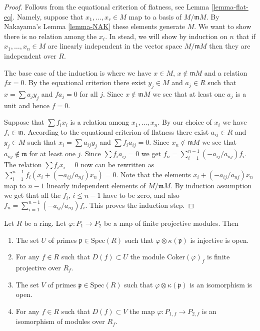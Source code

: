 \begin{proof}
Follows from the equational criterion of flatness, see
Lemma \ref{lemma-flat-eq}. Namely, suppose that 
$x_1,\ldots, x_r \in M$ map to a basis of
$M/\mathfrak mM$. By Nakayama's Lemma \ref{lemma-NAK}
these elements generate $M$. We want to show there
is no relation among the $x_i$. In stead, we will show
by induction on $n$ that if $x_1,\ldots,x_n \in M$
are linearly independent in the vector space
$M/\mathfrak mM$ then they are independent over $R$.

\medskip\noindent
The base case of the induction is where we have
$x \in M$, $x \not\in \mathfrak mM$ and a relation
$fx = 0$. By the equational criterion there
exist $y_j \in M$ and $a_j \in R$ such that
$x = \sum a_j y_j$ and $fa_j = 0$ for all $j$.
Since $x \not\in \mathfrak mM$ we see that
at least one $a_j$ is a unit and hence $f = 0 $.

\medskip\noindent
Suppose that $\sum f_i x_i$ is a relation among $x_1,\ldots,x_n$.
By our choice of $x_i$ we have $f_i \in \mathfrak m$.
According to the equational criterion of flatness there exist
$a_{ij} \in R$ and $y_j \in M$ such that
$x_i = \sum a_{ij} y_j$ and $\sum f_i a_{ij} = 0$.
Since $x_n \not \in \mathfrak mM$ we see that
$a_{nj}\not\in \mathfrak m$ for at least one $j$.
Since $\sum f_i a_{ij} = 0$ we get
$f_n = \sum_{i=1}^{n-1} (-a_{ij}/a_{nj}) f_i$.
The relation $\sum f_i x_i = 0$ now can be rewritten
as $\sum_{i=1}^{n-1} f_i( x_i + (-a_{ij}/a_{nj}) x_n) = 0$.
Note that the elements $x_i + (-a_{ij}/a_{nj}) x_n$ map
to $n-1$ linearly independent elements of $M/\mathfrak mM$.
By induction assumption we get that all the $f_i$, $i \leq n-1$
have to be zero, and also $f_n = \sum_{i=1}^{n-1} (-a_{ij}/a_{nj}) f_i$.
This proves the induction step.
\end{proof}

\begin{lemma}
\label{lemma-cokernel-flat}
Let $R$ be a ring. Let $\varphi : P_1 \to P_2$ be a map of
finite projective modules. Then
\begin{enumerate}
\item The set $U$ of primes
$\mathfrak p \in \text{Spec}(R)$ such that
$\varphi \otimes \kappa(\mathfrak p)$ is injective is open.
\item For any $f\in R$ such that
$D(f) \subset U$ the module $\text{Coker}(\varphi)_f$
is finite projective over $R_f$.
\item The set $V$ of primes $\mathfrak p \in \text{Spec}(R)$ such that
$\varphi \otimes \kappa(\mathfrak p)$ is an isomorphism
is open.
\item For any $f\in R$ such that
$D(f) \subset V$ the map $\varphi: P_{1,f} \to P_{2,f}$
is an isomorphism of modules over $R_f$.
\end{enumerate}
\end{lemma}

